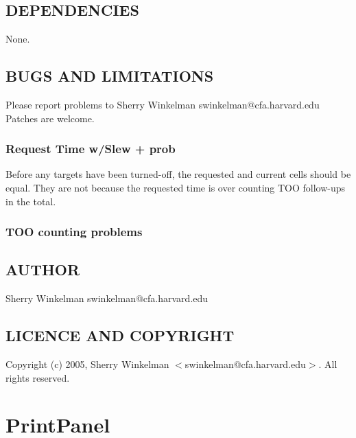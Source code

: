\documentclass{article}
\begin{document}
\subsection*{DEPENDENCIES\label{Panel_DEPENDENCIES}}


None.

\subsection*{BUGS AND LIMITATIONS\label{Panel_BUGS_AND_LIMITATIONS}}


Please report problems to Sherry Winkelman swinkelman@cfa.harvard.edu
Patches are welcome.

\subsubsection*{Request Time w/Slew + prob\label{Panel_Request_Time_w_Slew_prob}}


Before any targets have been turned-off, the requested and current cells 
should be equal.  They are not because the requested time is over counting 
TOO follow-ups in the total.

\subsubsection*{TOO counting problems\label{Panel_TOO_counting_problems}}
\subsection*{AUTHOR\label{Panel_AUTHOR}}


Sherry Winkelman swinkelman@cfa.harvard.edu

\subsection*{LICENCE AND COPYRIGHT\label{Panel_LICENCE_AND_COPYRIGHT}}


Copyright (c) 2005, Sherry Winkelman $<$swinkelman@cfa.harvard.edu$>$. All rights 
reserved.

\clearpage
\section{PrintPanel\label{PrintPanel}}
\end{document}
